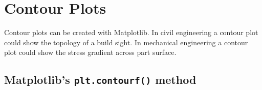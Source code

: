\documentclass{book}
\begin{document}
    \begin{center}
    \end{center}
    { \hspace*{\fill} \\}
    
    \begin{center}
    \end{center}
    { \hspace*{\fill} \\}
    
    \begin{center}
    \end{center}
    { \hspace*{\fill} \\}
    
    \begin{center}
    \end{center}
    { \hspace*{\fill} \\}
    
    \begin{center}
    \end{center}
    { \hspace*{\fill} \\}
    

    
        \hypertarget{contour-plots}{%
\section{Contour Plots}\label{contour-plots}}
    




    
        Contour plots can be created with Matplotlib. In civil engineering a
contour plot could show the topology of a build sight. In mechanical
engineering a contour plot could show the stress gradient across part
surface.
    




    
        \hypertarget{matplotlibs-plt.contourf-method}{%
\subsection{\texorpdfstring{Matplotlib's \texttt{plt.contourf()}
method}{Matplotlib's plt.contourf() method}}\label{matplotlibs-plt.contourf-method}}
    
\end{document}
